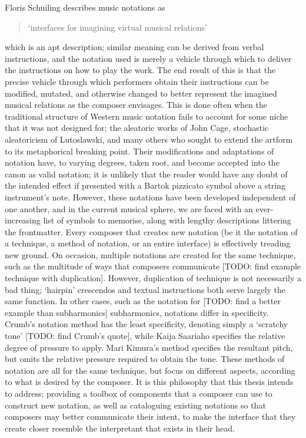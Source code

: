 Floris Schuiling describes music notations as \begin{quotation}
`interfaces for imagining virtual musical relations'
\end{quotation}
which is an apt description; similar meaning can be derived from verbal instructions, and the notation used is merely a vehicle through which to deliver the instructions on how to play the work.
The end result of this is that the precise vehicle through which performers obtain their instructions can be modified, mutated, and otherwise changed to better represent the imagined musical relations as the composer envisages.
This is done often when the traditional structure of Western music notation fails to account for some niche that it was not designed for; the aleatoric works of John Cage, stochastic aleatoricism of Lutoslawski, and many others who sought to extend the artform to its metaphorical breaking point.
Their modifications and adaptations of notation have, to varying degrees, taken root, and become accepted into the canon as valid notation; it is unlikely that the reader would have any doubt of the intended effect if presented with a Bartok pizzicato symbol above a string instrument's note.
However, these notations have been developed independent of one another, and in the current musical sphere, we are faced with an ever-increasing list of symbols to memorise, along with lengthy descriptions littering the frontmatter.
Every composer that creates new notation (be it the notation of a technique, a method of notation, or an entire interface) is effectively treading new ground.
On occasion, multiple notations are created for the same technique, such as the multitude of ways that composers communicate [TODO: find example technique with duplication].
However, duplication of technique is not necessarily a bad thing; `hairpin' crescendos and textual instructions both serve largely the same function.
In other cases, such as the notation for [TODO: find a better example than subharmonics] subharmonics, notations differ in specificity. 
Crumb's notation method has the least specificity, denoting simply a `scratchy tone' [TODO: find Crumb's quote], while Kaija Saariaho specifies the relative degree of pressure to apply.
Mari Kimura's method specifies the resultant pitch, but omits the relative pressure required to obtain the tone.
These methods of notation are all for the same technique, but focus on different aspects, according to what is desired by the composer.
It is this philosophy that this thesis intends to address; 
providing a toolbox of components that a composer can use to construct new notation, as well as cataloguing existing notations so that composers may better communicate their intent, to make the interface that they create closer resemble the interpretant that exists in their head.

